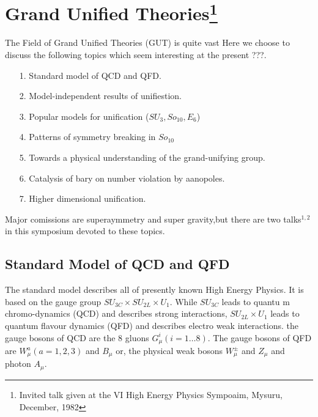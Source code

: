 \chapter[Grand Unified Theories]{Grand Unified Theories\footnote{Invited talk given at the VI High Energy Physics Sympoaim, Mysuru, December, 1982}}\label{chap26}


The Field of Grand Unified Theories (GUT) is quite vast Here we choose to discuss the following topics which seem interesting at the present ???.

\begin{itemize}
\item[1.] Standard model of QCD and QFD.
\item[2.] Model-independent results of unifiestion.
\item[3.] Popular models for unification ($SU_{3}, So_{10}, E_{6}$)
\item[4.] Patterns of symmetry breaking in $So_{10}$
\item[5.] Towards a physical understanding of the grand-unifying group.
\item[6.] Catalysis of bary on number violation by aanopoles.
\item[7.] Higher dimensional unification.
\end{itemize}

Major comissions are superaymmetry and super gravity,but there are two talks$^{1, 2}$ in this symposium devoted to these topics.

\section{Standard Model of QCD and QFD}\label{sec-1}

The standard model describes all of presently known High Energy Physics. It is based on the gauge group $SU_{3C} \times SU_{2L} \times U_{1}$. While $SU_{3C}$ leads to quantu m chromo-dynamics (QCD) and describes strong interactions, $SU_{2L} \times U_{1}$ leads to quantum flavour dynamics (QFD) and describes electro weak interactions. the gauge bosons of QCD are the 8 gluons $G_{\mu}^{i} (i= 1 \ldots 8)$. The gauge bosons of QFD are $W^{a}_{\mu}(a=1,2,3)$ and $B_{\mu}$ or, the physical weak bosons $W^{\pm}_{\mu}$ and $Z_{\mu}$ and photon $A_{\mu}$.

